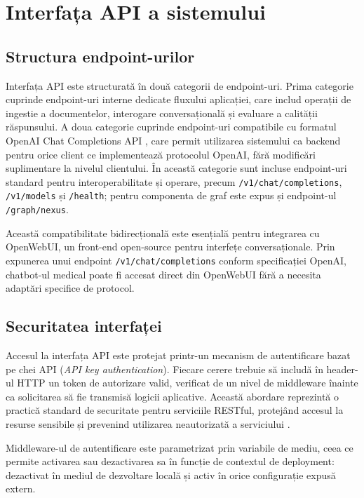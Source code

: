 \documentclass[12pt, a4paper, oneside, romanian]{teza-upb}
\begin{document}
\section{Interfața API a sistemului}

\subsection{Structura endpoint-urilor}

Interfața API este structurată în două categorii de endpoint-uri. Prima categorie cuprinde endpoint-uri interne dedicate fluxului aplicației, care includ operații de ingestie a documentelor, interogare conversațională și evaluare a calității răspunsului. A doua categorie cuprinde endpoint-uri compatibile cu formatul OpenAI Chat Completions API \cite{openai_api}, care permit utilizarea sistemului ca backend pentru orice client ce implementează protocolul OpenAI, fără modificări suplimentare la nivelul clientului. În această categorie sunt incluse endpoint-uri standard pentru interoperabilitate și operare, precum \texttt{/v1/chat/completions}, \texttt{/v1/models} și \texttt{/health}; pentru componenta de graf este expus și endpoint-ul \texttt{/graph/nexus}.

Această compatibilitate bidirecțională este esențială pentru integrarea cu OpenWebUI, un front-end open-source pentru interfețe conversaționale. Prin expunerea unui endpoint \texttt{/v1/chat/completions} conform specificației OpenAI, chatbot-ul medical poate fi accesat direct din OpenWebUI fără a necesita adaptări specifice de protocol.

\subsection{Securitatea interfaței}

Accesul la interfața API este protejat printr-un mecanism de autentificare bazat pe chei API (\textit{API key authentication}). Fiecare cerere trebuie să includă în header-ul HTTP un token de autorizare valid, verificat de un nivel de middleware înainte ca solicitarea să fie transmisă logicii aplicative. Această abordare reprezintă o practică standard de securitate pentru serviciile RESTful, protejând accesul la resurse sensibile și prevenind utilizarea neautorizată a serviciului \cite{flask_doc}.

Middleware-ul de autentificare este parametrizat prin variabile de mediu, ceea ce permite activarea sau dezactivarea sa în funcție de contextul de deployment: dezactivat în mediul de dezvoltare locală și activ în orice configurație expusă extern.
\end{document}
